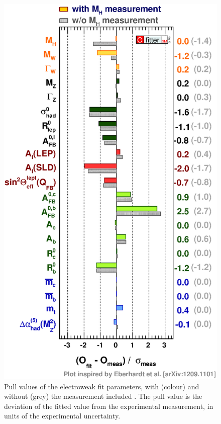 \begin{figure}[p]
	\includegraphics[width=\mediumfigwidth]{tex/conclusions/ewfit_pulls}
	\caption{Pull values of the electroweak fit parameters, with (colour) and without 
	(grey) the \mH measurement included \cite{Gfitter:2013}. The pull value is the 
	deviation of the fitted value from the experimental measurement, in units of the 
	experimental uncertainty.}
	\label{fig:concl:ewfit_pulls}
\end{figure}



